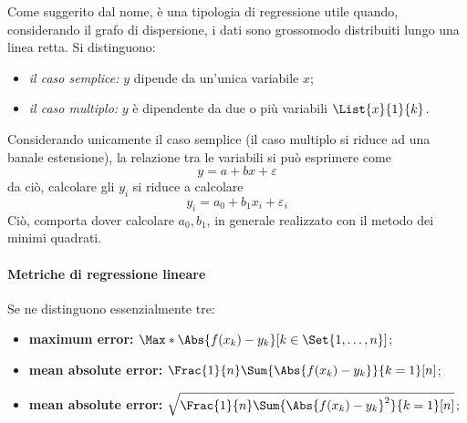 \documentclass{subfiles}
\begin{document}
Come suggerito dal nome, è una tipologia di regressione utile quando, considerando il grafo di dispersione, i dati sono grossomodo distribuiti lungo una linea retta.
Si distinguono:
\begin{itemize}
    \item \emph{il caso semplice:} \(y\) dipende da un'unica variabile \(x\);
    \item \emph{il caso multiplo:} \(y\) è dipendente da due o più variabili \(\List{x}{1}{k}\).
\end{itemize}

Considerando unicamente il caso semplice (il caso multiplo si riduce ad una banale estensione), la relazione tra le variabili si può esprimere come
\[
    y = a + bx + \varepsilon
\]
da ciò, calcolare gli \(y_{i}\) si riduce a calcolare
\[
    y_{i} = a_{0} + b_{1}x_{i} + \varepsilon_{i}
\]
Ciò, comporta dover calcolare \(a_{0}, b_{1}\), in generale realizzato con il metodo dei minimi quadrati.

\paragraph*{Metriche di regressione lineare}
Se ne distinguono essenzialmente tre:
\begin{itemize}
    \item \textbf{maximum error:} \(\Max*{\Abs{f(x_{k}) - y_{k}}}[k \in \Set{1, \ldots, n}]\);
    \item \textbf{mean absolute error:} \(\Frac{1}{n} \Sum{\Abs{f(x_{k}) - y_{k}}}{k = 1}[n]\);
    \item \textbf{mean absolute error:} \(\sqrt{\Frac{1}{n} \Sum{\Abs{f(x_{k}) - y_{k}}^{2}}{k = 1}[n]}\);
\end{itemize}
\end{document}
